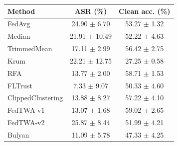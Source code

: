 \begin{tabular}{lcc}
\toprule
Method & ASR (\%) & Clean acc. (\%) \\
\midrule
FedAvg & 24.90 $\pm$ 6.70 & 53.27 $\pm$ 1.32 \\
Median & 21.91 $\pm$ 10.49 & 52.22 $\pm$ 4.63 \\
TrimmedMean & 17.11 $\pm$ 2.99 & 56.42 $\pm$ 2.75 \\
Krum & 22.21 $\pm$ 12.75 & 27.25 $\pm$ 0.58 \\
RFA & 13.77 $\pm$ 2.00 & 58.71 $\pm$ 1.53 \\
FLTrust & 7.33 $\pm$ 9.07 & 50.33 $\pm$ 4.60 \\
ClippedClustering & 13.88 $\pm$ 8.27 & 57.22 $\pm$ 4.10 \\
FedTWA-v1 & 13.07 $\pm$ 1.68 & 59.02 $\pm$ 2.65 \\
FedTWA-v2 & 25.87 $\pm$ 8.44 & 51.99 $\pm$ 4.21 \\
Bulyan & 11.09 $\pm$ 5.78 & 47.33 $\pm$ 4.25 \\
\bottomrule
\end{tabular}